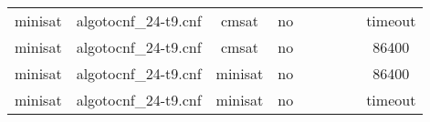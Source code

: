 \begin{appendices}
\begin{table}[p]
\begin{center}
\begin{tabular}{l|cccccccc}
  minisat                        & algotocnf\_24-t9.cnf           & cmsat      & no    &            &           &           &            & timeout \\ %
  minisat                        & algotocnf\_24-t9.cnf           & cmsat      & no    &            &           &           &            & 86400 \\ %
  minisat                        & algotocnf\_24-t9.cnf           & minisat    & no    &            &           &           &            & 86400 \\ %
  minisat                        & algotocnf\_24-t9.cnf           & minisat    & no    &            &           &           &            & timeout \\ %
    \end{tabular}
  \end{center}
\end{table}

\newpage


\end{appendices}
